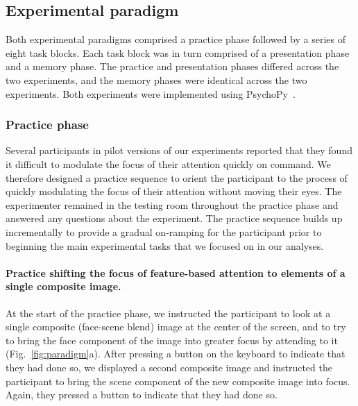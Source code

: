 \documentclass[english]{article}
\begin{document}
\subsection*{Experimental paradigm}
Both experimental paradigms comprised a practice phase followed by a series of eight task blocks.  Each task block was in turn comprised of a presentation phase and a memory phase.  The practice and presentation phases differed across the two experiments, and the memory phases were identical across the two experiments.  Both experiments were implemented using PsychoPy~\citep{PeirEtal19}.

\subsubsection*{Practice phase}
Several participants in pilot versions of our experiments reported that they found it difficult to modulate the focus of their attention quickly on command.  We therefore designed a practice sequence to orient the participant to the process of quickly modulating the focus of their attention without moving their eyes.  The experimenter remained in the testing room throughout the practice phase and answered any questions about the experiment.  The practice sequence builds up incrementally to provide a gradual on-ramping for the participant prior to beginning the main experimental tasks that we focused on in our analyses.

\paragraph{Practice shifting the focus of feature-based attention to elements of a single composite image.}
At the start of the practice phase, we instructed the participant to look at a single composite (face-scene blend) image at the center of the screen, and to try to bring the face component of the image into greater focus by attending to it (Fig.~\ref{fig:paradigm}a).  After pressing a button on the keyboard to indicate that they had done so, we displayed a second composite image and instructed the participant to bring the scene component of the new composite image into focus.  Again, they pressed a button to indicate that they had done so.
\end{document}
